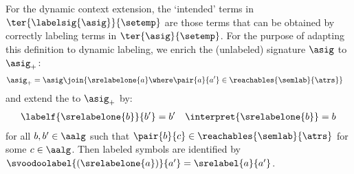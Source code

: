 For the dynamic context extension, the `intended' terms in $\ter{\labelsig{\asig}}{\setemp}$
are those terms that can be obtained by correctly labeling terms in $\ter{\asig}{\setemp}$.
For the purpose of adapting this definition to dynamic labeling,
we enrich the (unlabeled) signature $\asig$ to $\asig_{+}$:
\begin{align*}
  \asig_{+} &= \asig \join \{ \srelabelone{a} \where \pair{a}{a'}\in\reachables{\semlab}{\atrs} \} 
\end{align*}
and extend the \clabeling{} to $\asig_{+}$ by:
\begin{align*}
  \labelf{\srelabelone{b}}{b'} &= b' & \interpret{\srelabelone{b}} = b
\end{align*}
for all $b,b'\in\aalg$ such that $\pair{b}{c}\in \reachables{\semlab}{\atrs}$ for some $c\in\aalg$.
Then labeled symbols are identified by $\svoodoolabel{(\srelabelone{a})}{a'} = \srelabel{a}{a'}$.


